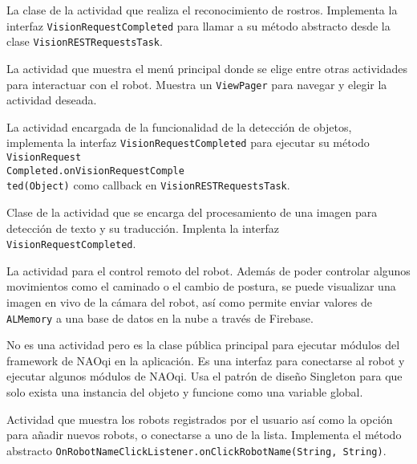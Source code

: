 
La clase de la actividad que realiza el reconocimiento de rostros. Implementa la interfaz \texttt{VisionRequestCompleted} para llamar a su método abstracto desde la clase \texttt{VisionRESTRequestsTask}.



La actividad que muestra el menú principal donde se elige entre otras actividades para interactuar con el robot. Muestra un \texttt{ViewPager} para navegar y elegir la actividad deseada.



La actividad encargada de la funcionalidad de la detección de objetos, implementa la interfaz \texttt{VisionRequestCompleted} para ejecutar su método \texttt{VisionRequest\\Completed.onVisionRequestComple\\ted(Object)} como callback en \texttt{VisionRESTRequestsTask}.




Clase de la actividad que se encarga del procesamiento de una imagen 
para detección de texto y su traducción. Implenta la interfaz 
\texttt{VisionRequestCompleted}.


La actividad para el control remoto del robot. Además de poder 
controlar algunos movimientos como el caminado o el cambio de postura, 
se puede visualizar una imagen en vivo de la cámara del robot, así 
como permite enviar valores de \texttt{ALMemory} a una base de datos en la nube 
a través de Firebase.


No es una actividad pero es la clase pública principal para ejecutar módulos del framework de NAOqi en la aplicación. Es una interfaz para conectarse al robot y ejecutar algunos módulos de NAOqi. Usa el patrón de diseño Singleton para que solo exista una instancia del objeto y funcione como una variable global.



Actividad que muestra los robots registrados por el usuario así como la opción para añadir nuevos robots, o conectarse a uno de la lista. Implementa el método abstracto \texttt{OnRobotNameClickListener.onClickRobotName(String, String)}.

